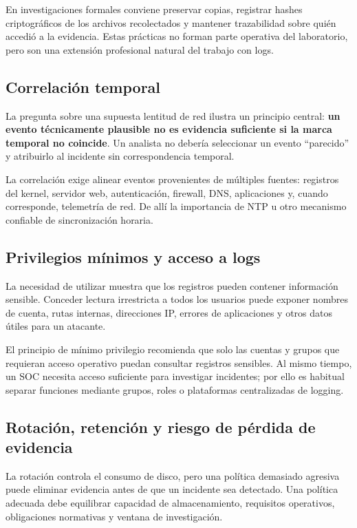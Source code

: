 \documentclass[11pt,a4paper]{article}
\newcommand{\cmd}[1]{\texttt{\detokenize{#1}}}
\begin{document}
En investigaciones formales conviene preservar copias, registrar hashes criptográficos de los archivos recolectados y mantener trazabilidad sobre quién accedió a la evidencia. Estas prácticas no forman parte operativa del laboratorio, pero son una extensión profesional natural del trabajo con logs.

\subsection{Correlación temporal}
La pregunta sobre una supuesta lentitud de red ilustra un principio central: \textbf{un evento técnicamente plausible no es evidencia suficiente si la marca temporal no coincide}. Un analista no debería seleccionar un evento ``parecido'' y atribuirlo al incidente sin correspondencia temporal.

La correlación exige alinear eventos provenientes de múltiples fuentes: registros del kernel, servidor web, autenticación, firewall, DNS, aplicaciones y, cuando corresponde, telemetría de red. De allí la importancia de NTP u otro mecanismo confiable de sincronización horaria.

\subsection{Privilegios mínimos y acceso a logs}
La necesidad de utilizar \cmd{sudo} muestra que los registros pueden contener información sensible. Conceder lectura irrestricta a todos los usuarios puede exponer nombres de cuenta, rutas internas, direcciones IP, errores de aplicaciones y otros datos útiles para un atacante.

El principio de mínimo privilegio recomienda que solo las cuentas y grupos que requieran acceso operativo puedan consultar registros sensibles. Al mismo tiempo, un SOC necesita acceso suficiente para investigar incidentes; por ello es habitual separar funciones mediante grupos, roles o plataformas centralizadas de logging.

\subsection{Rotación, retención y riesgo de pérdida de evidencia}
La rotación controla el consumo de disco, pero una política demasiado agresiva puede eliminar evidencia antes de que un incidente sea detectado. Una política adecuada debe equilibrar capacidad de almacenamiento, requisitos operativos, obligaciones normativas y ventana de investigación.
\end{document}
